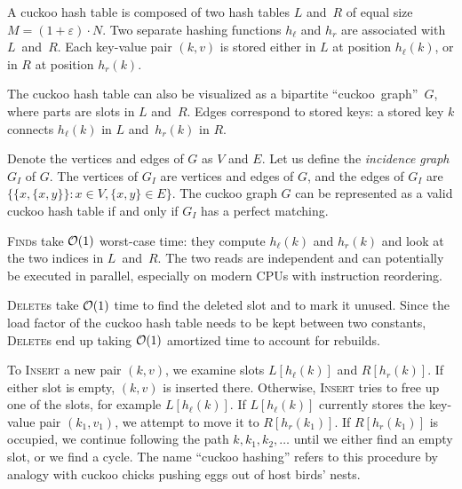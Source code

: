 A cuckoo hash table is composed of two hash tables $L$ and~$R$ of equal size
$M=(1+\varepsilon)\cdot N$.
Two separate hashing functions $h_\ell$ and $h_r$ are associated with
$L$~and~$R$.
Each key-value pair $(k,v)$ is stored either in $L$ at position $h_\ell(k)$,
or in $R$ at position $h_r(k)$.

The cuckoo hash table can also be visualized as a bipartite
``cuckoo~graph''~$G$, where parts are slots in $L$ and~$R$. Edges
correspond to stored keys:
a stored key $k$ connects $h_\ell(k)$ in $L$ and~$h_r(k)$ in $R$.

Denote the vertices and edges of $G$ as $V$ and $E$.
Let us define the \emph{incidence graph} $G_I$ of $G$. The vertices of $G_I$
are vertices and edges of $G$, and the edges of $G_I$ are $\{\{x,\{x,y\}\}: x\in V,
\{x,y\}\in E\}$. The cuckoo graph $G$ can be represented as a valid cuckoo hash
table if and only if $G_I$ has a perfect matching.

\textsc{Find}s take $\mathcal{O}(1)$ worst-case time: they compute $h_\ell(k)$ and $h_r(k)$
and look at the two indices in $L$~and~$R$. The two reads are independent and
can potentially be executed in parallel, especially on modern CPUs with
instruction reordering.

\textsc{Delete}s take $\mathcal{O}(1)$ time to find the deleted slot and to mark
it unused. Since the load factor of the cuckoo hash table needs to be kept
between two constants, \textsc{Delete}s end up taking $\mathcal{O}(1)$ amortized time
to account for rebuilds.

To \textsc{Insert} a new pair $(k,v)$, we examine slots $L[h_\ell(k)]$ and
$R[h_r(k)]$. If either slot is empty, $(k,v)$ is inserted there. Otherwise,
\textsc{Insert} tries to free up one of the slots, for example $L[h_\ell(k)]$.
If $L[h_\ell(k)]$ currently stores the key-value pair $(k_1,v_1)$, we attempt to
move it to $R[h_r(k_1)]$. If $R[h_r(k_1)]$ is occupied, we continue following
the path $k,k_1,k_2,\ldots$ until we either find an empty slot, or we find
a cycle.
The name ``cuckoo hashing'' refers to this procedure by analogy with
cuckoo chicks pushing eggs out of host birds' nests.

